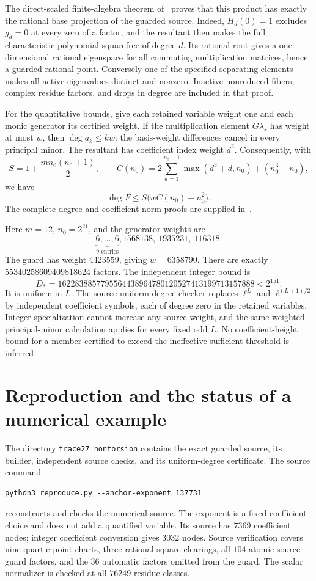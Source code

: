 \documentclass[11pt,a4paper]{article}
\begin{document}
The direct-scaled finite-algebra theorem of~\cite{Weighted} proves
that this product has exactly the rational base projection of the
guarded source. Indeed, $H_d(0)=1$ excludes $g_d=0$ at every zero
of a factor, and the resultant then makes the full characteristic
polynomial squarefree of degree $d$. Its rational root gives a
one-dimensional rational eigenspace for all commuting multiplication
matrices, hence a guarded rational point. Conversely one of the
specified separating elements makes all active eigenvalues distinct
and nonzero. Inactive nonreduced fibers, complex residue factors,
and drops in degree are included in that proof.

For the quantitative bounds, give each retained variable weight one
and each monic generator its certified weight. If the multiplication
element $G\lambda_s$ has weight at most $w$, then
$\deg a_k\le kw$: the basis-weight differences cancel in every
principal minor. The resultant has coefficient index weight $d^2$.
Consequently, with
\[
 S=1+\frac{m n_0(n_0+1)}2,\qquad
 C(n_0)=2\sum_{d=1}^{n_0-1}\max(d^3+d,n_0)+(n_0^3+n_0),
\]
we have
\[
                      \deg F\le S\bigl(wC(n_0)+n_0^2\bigr).
\]
The complete degree and coefficient-norm proofs are supplied
in~\cite{Weighted}.

Here $m=12$, $n_0=2^{21}$, and the generator weights are
\[
 \underbrace{6,\ldots,6}_{9\text{ entries}},
 1568138,\ 1935231,\ 116318.
\]
The guard has weight $4423559$, giving $w=6358790$.
There are exactly $55340258609409818624$ factors.
The independent integer bound is
\[
 D_*=1622838857795564438964780120527413199713157888
       <2^{151}.
\]
It is uniform in $L$. The source uniform-degree checker replaces
$\ell^L$ and $\ell^{(L+1)/2}$ by independent coefficient symbols,
each of degree zero in the retained variables. Integer specialization
cannot increase any source weight, and the same weighted
principal-minor calculation applies for every fixed odd $L$.
No coefficient-height bound for a member certified to exceed the
ineffective sufficient threshold is inferred.

\section{Reproduction and the status of a numerical example}

The directory \texttt{trace27\_nontorsion} contains the exact guarded
source, its builder, independent source checks, and its uniform-degree
certificate. The source command
\begin{verbatim}
python3 reproduce.py --anchor-exponent 137731
\end{verbatim}
reconstructs and checks the numerical source. The exponent is a fixed
coefficient choice and does not add a quantified variable. Its source
has $7369$ coefficient nodes; integer coefficient conversion gives
$3032$ nodes. Source verification covers nine quartic point charts,
three rational-square clearings, all $104$ atomic source guard factors,
and the $36$ automatic factors omitted from the guard. The scalar
normalizer is checked at all $76249$ residue classes.
\end{document}
